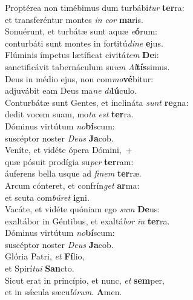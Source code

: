 \evenverse Proptérea non timébimus dum turbábi\textit{tur} \textbf{ter}ra:~\*\\
\evenverse et transferéntur montes \textit{in} \textit{cor} \textbf{ma}ris.\\
\oddverse Sonuérunt, et turbátæ sunt aquæ \textit{e}\textbf{ó}rum:~\*\\
\oddverse conturbáti sunt montes in fortitú\textit{di}\textit{ne} \textbf{e}jus.\\
\evenverse Flúminis ímpetus lætíficat civitá\textit{tem} \textbf{De}i:~\*\\
\evenverse sanctificávit tabernáculum su\textit{um} \textit{Al}\textbf{tís}simus.\\
\oddverse Deus in médio ejus, non com\textit{mo}\textbf{vé}bitur:~\*\\
\oddverse adjuvábit eam Deus ma\textit{ne} \textit{di}\textbf{lú}culo.\\
\evenverse Conturbátæ sunt Gentes, et inclináta \textit{sunt} \textbf{re}gna:~\*\\
\evenverse dedit vocem suam, mo\textit{ta} \textit{est} \textbf{ter}ra.\\
\oddverse Dóminus virtútum \textit{no}\textbf{bí}scum:~\*\\
\oddverse suscéptor noster \textit{De}\textit{us} \textbf{Ja}cob.\\
\evenverse Veníte, et vidéte ópera Dómini,~+\\
\evenverse  quæ pósuit prodígia su\textit{per} \textbf{ter}ram:~\*\\
\evenverse áuferens bella usque ad \textit{fi}\textit{nem} \textbf{ter}ræ.\\
\oddverse Arcum cónteret, et confrín\textit{get} \textbf{ar}ma:~\*\\
\oddverse et scuta com\textit{bú}\textit{ret} \textbf{i}gni.\\
\evenverse Vacáte, et vidéte quóniam ego \textit{sum} \textbf{De}us:~\*\\
\evenverse exaltábor in Géntibus, et exaltá\textit{bor} \textit{in} \textbf{ter}ra.\\
\oddverse Dóminus virtútum \textit{no}\textbf{bí}scum:~\*\\
\oddverse suscéptor noster \textit{De}\textit{us} \textbf{Ja}cob.\\
\evenverse Glória Patri, \textit{et} \textbf{Fí}lio,~\*\\
\evenverse et Spirí\textit{tu}\textit{i} \textbf{San}cto.\\
\oddverse Sicut erat in princípio, et nunc, \textit{et} \textbf{sem}per,~\*\\
\oddverse et in sǽcula sæcu\textit{ló}\textit{rum}. \textbf{A}men.\\
